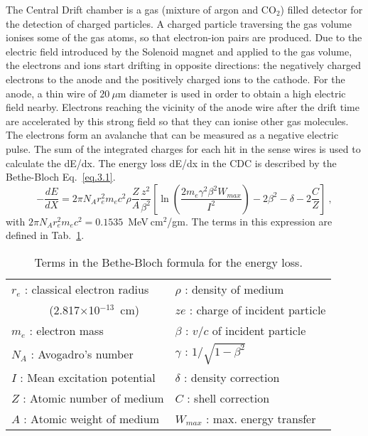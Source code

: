 The Central Drift chamber is a gas (mixture of argon and CO$_{2}$) filled detector for the detection of charged particles. A charged particle traversing the gas volume ionises some of the gas atoms, so that electron-ion pairs are produced. Due to the electric field introduced by the Solenoid magnet and applied to the gas volume, the electrons and ions start drifting in opposite directions: the negatively charged electrons to the anode and the positively charged ions to the cathode. For the anode, a thin wire of $20~\mu$m diameter is used in order to obtain a high electric field nearby. Electrons reaching the vicinity of the anode wire after the drift time are accelerated by this strong field so that they can ionise other gas molecules. The electrons form an avalanche that can be measured as a negative electric pulse. The sum of the integrated charges for each hit in the sense wires is used to calculate the dE/dx.
The energy loss dE/dx in the CDC is described by the Bethe-Bloch Eq.~\ref{eq.3.1}.
\begin{equation}
    \label{eq.3.1}
    -\frac{dE}{dX} = 2 \pi N_A r_e^2 m_e c^2 \rho \frac{Z}{A} \frac{z^2}{\beta^2} \left [ \ln \left( \frac{2 m_e \gamma^2 \beta^2 W_{max}}{I^2} \right) - 2 \beta^2 - \delta - 2\frac{C}{Z} \right]~,
\end{equation}
with $2 \pi N_A r_e^2 m_e c^2 = 0.1535$~MeV$~\!$cm$^2$/gm. The terms in this expression are defined in Tab.~\ref{tab.3.1}.
\begin{table}[b]
    \begin{center}
        \caption{\small{Terms in the Bethe-Bloch formula for the energy loss.}}
        \label{tab.3.1}
        \begin{tabular} {||l||l||} \hline
            $r_e$ : classical electron radius   & $\rho$ : density of medium \\
            ~~~~~~ (2.817$\times$10$^{-13}$~cm) & $ze$ : charge of incident particle \\
            $m_e$ : electron mass               & $\beta$ : $v/c$ of incident particle \\
            $N_A$ : Avogadro's number           & $\gamma$ : $1/\sqrt{1 - \beta^2}$ \\
            $I$  : Mean excitation potential    & $\delta$ : density correction \\
            $Z$ : Atomic number of medium       & $C$ : shell correction \\
            $A$ : Atomic weight of medium       & $W_{max}$ : max. energy transfer \\ \hline
        \end{tabular}
    \end{center}
\end{table}
